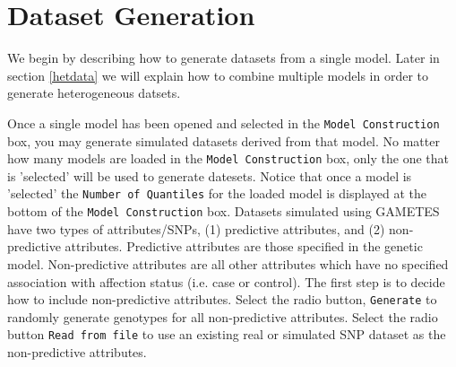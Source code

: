 \documentclass{report}
\begin{document}
\section{Dataset Generation}\label{datgen}
We begin by describing how to generate datasets from a single model.  Later in section \ref{hetdata} we will explain how to combine multiple models in order to generate heterogeneous datsets.

Once a single model has been opened and selected in the \texttt{Model Construction} box, you may generate simulated datasets derived from that model.  No matter how many models are loaded in the \texttt{Model Construction} box, only the one that is 'selected' will be used to generate datesets.  Notice that once a model is 'selected' the \texttt{Number of Quantiles} for the loaded model is displayed at the bottom of the \texttt{Model Construction} box.  Datasets simulated using GAMETES have two types of attributes/SNPs, (1) predictive attributes, and (2) non-predictive attributes.  Predictive attributes are those specified in the genetic model.  Non-predictive attributes are all other attributes which have no specified association with affection status (i.e. case or control).  The first step is to decide how to include non-predictive attributes.  Select the radio button, \texttt{Generate} to randomly generate genotypes for all non-predictive attributes.  Select the radio button \texttt{Read from file} to use an existing real or simulated SNP dataset as the non-predictive attributes.  
\end{document}
